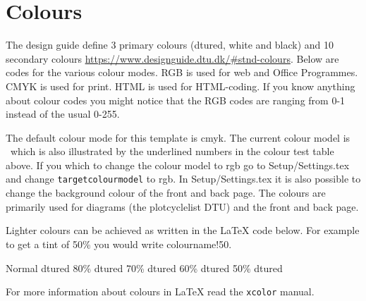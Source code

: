\chapter{Colours} \label{sec:colours}
The design guide define 3 primary colours (dtured, white and black)
and 10 secondary colours
\url{https://www.designguide.dtu.dk/#stnd-colours}. Below are codes
for the various colour modes. RGB is used for web and Office
Programmes. CMYK is used for print. HTML is used for HTML-coding. If
you know anything about colour codes you might notice that the RGB
codes are ranging from 0-1 instead of the usual 0-255.

\begin{testcolors}
\end{testcolors}

The default colour mode for this template is cmyk. The current colour
model is \targetcolourmodel~which is also illustrated by the
underlined numbers in the colour test table above.  If you which to
change the colour model to rgb go to Setup/Settings.tex and change
\texttt{targetcolourmodel} to rgb. In Setup/Settings.tex it is also
possible to change the background colour of the front and back page.
The colours are primarily used for diagrams (the plotcyclelist DTU)
and the front and back page.

Lighter colours can be achieved as written in the \LaTeX{} code
below. For example to get a tint of 50\% you would write
colourname!50.  \newline
{\raggedright
  \textcolor{dtured}{Normal dtured} \qquad
  \textcolor{dtured!80}{80\% dtured} \qquad
  \textcolor{dtured!70}{70\% dtured} \qquad
  \textcolor{dtured!60}{60\% dtured} \qquad
  \textcolor{dtured!50}{50\% dtured}
}
\newline
For more information about colours in \LaTeX{} read the \texttt{xcolor} manual.

